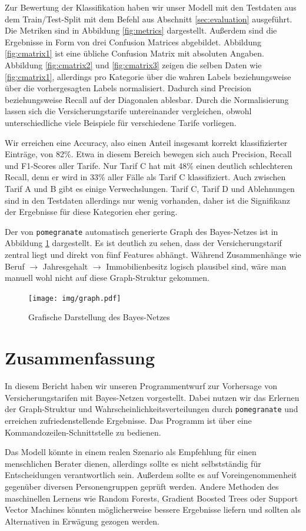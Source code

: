 Zur Bewertung der Klassifikation haben wir unser Modell mit den Testdaten aus dem Train/Test-Split mit dem Befehl aus Abschnitt \ref{sec:evaluation} ausgeführt. Die Metriken sind in Abbildung \ref{fig:metrics} dargestellt. Außerdem sind die Ergebnisse in Form von drei Confusion Matrices abgebildet. Abbildung \ref{fig:cmatrix1} ist eine übliche Confusion Matrix mit absoluten Angaben. Abbildung \ref{fig:cmatrix2} und \ref{fig:cmatrix3} zeigen die selben Daten wie \ref{fig:cmatrix1}, allerdings pro Kategorie über die wahren Labels beziehungsweise über die vorhergesagten Labels normalisiert. Dadurch sind Precision beziehungsweise Recall auf der Diagonalen ablesbar. Durch die Normalisierung lassen sich die Versicherungstarife untereinander vergleichen, obwohl unterschiedliche viele Beispiele für verschiedene Tarife vorliegen.

Wir erreichen eine Accuracy, also einen Anteil insgesamt korrekt klassifizierter Einträge, von 82\%. Etwa in diesem Bereich bewegen sich auch Precision, Recall und F1-Scores aller Tarife. Nur Tarif C hat mit 48\% einen deutlich schlechteren Recall, denn er wird in 33\% aller Fälle als Tarif C klassifiziert. Auch zwischen Tarif A und B gibt es einige Verwechslungen. Tarif C, Tarif D und Ablehnungen sind in den Testdaten allerdings nur wenig vorhanden, daher ist die Signifikanz der Ergebnisse für diese Kategorien eher gering.

Der von \texttt{pomegranate} automatisch generierte Graph des Bayes-Netzes ist in Abbildung \ref{fig:bayesnet} dargestellt. Es ist deutlich zu sehen, dass der Versicherungstarif zentral liegt und direkt von fünf Features abhängt. Während Zusammenhänge wie Beruf $\xrightarrow{}$ Jahresgehalt $\xrightarrow{}$ Immobilienbesitz logisch plausibel sind, wäre man manuell wohl nicht auf diese Graph-Struktur gekommen.

\begin{figure}
    \centering
    \texttt{[image: img/graph.pdf]}
    \caption{Grafische Darstellung des Bayes-Netzes}
    \label{fig:bayesnet}
\end{figure}


\newpage
\section{Zusammenfassung}
In diesem Bericht haben wir unseren Programmentwurf zur Vorhersage von Versicherungstarifen mit Bayes-Netzen vorgestellt. Dabei nutzen wir das Erlernen der Graph-Struktur und Wahrscheinlichkeitsverteilungen durch \texttt{pomegranate} und erreichen zufriedenstellende Ergebnisse. Das Programm ist über eine Kommandozeilen-Schnittstelle zu bedienen.

Das Modell könnte in einem realen Szenario als Empfehlung für einen menschlichen Berater dienen, allerdings sollte es nicht selbstständig für Entscheidungen verantwortlich sein. Außerdem sollte es auf Voreingenommenheit gegenüber diversen Personengruppen geprüft werden. Andere Methoden des maschinellen Lernens wie Random Forests, Gradient Boosted Trees oder Support Vector Machines könnten möglicherweise bessere Ergebnisse liefern und sollten als Alternativen in Erwägung gezogen werden.
